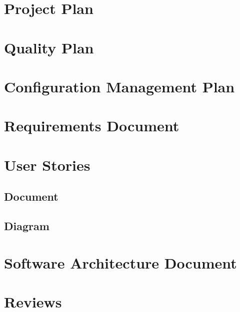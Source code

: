 
\chapter{Project Plan}



\chapter{Quality Plan}



\chapter{Configuration Management Plan}



\chapter{Requirements Document}




\chapter{User Stories}

\section{Document}



\section{Diagram}


\chapter{Software Architecture Document}





\chapter{Reviews}

